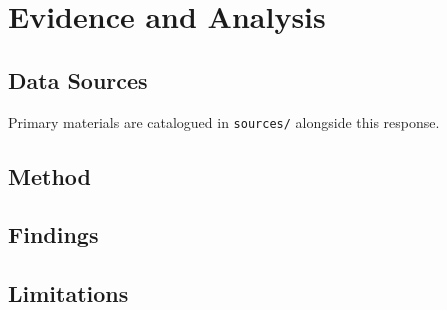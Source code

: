 \chapter{Evidence and Analysis}
\label{ch:evidence}


\section{Data Sources}
\label{sec:evidence:sources}

Primary materials are catalogued in \texttt{sources/} alongside this response.

\section{Method}
\label{sec:evidence:method}

\lipsum[1]

\section{Findings}
\label{sec:evidence:findings}

\lipsum[2-3]

\section{Limitations}
\label{sec:evidence:limitations}

\lipsum[4]

